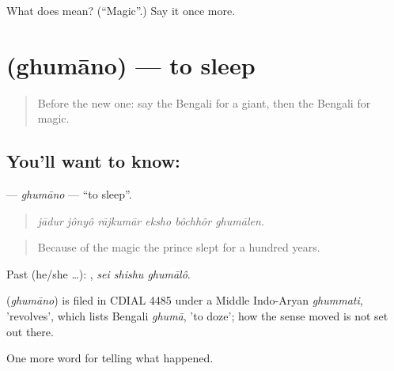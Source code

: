 \begin{tcolorbox}[breakable,colback=teal!4,colframe=teal!35!black,title={Before you move on}]
What does  mean? (\textquotedblleft{}Magic\textquotedblright{}.) Say it once more.
\end{tcolorbox}
\section[\texorpdfstring{\bn{ঘুমানো} (ghumāno)}{ঘুমানো (ghumāno)}]{ (ghumāno) — to sleep}

\label{lesson:BN-C321-ghumano}



\begin{quote}
Before the new one: say the Bengali for a giant, then the Bengali for magic.
\end{quote}

\subsection*{You'll want to know: }
\textbf{} — \emph{ghumāno} — \textquotedblleft{}to sleep\textquotedblright{}.

\begin{quote}
     
\end{quote}

\begin{quote}
\emph{jādur jônyô rājkumār eksho bôchhôr ghumālen.}
\end{quote}

\begin{quote}
Because of the magic the prince slept for a hundred years.
\end{quote}

Past (he/she …):   , \emph{sei shishu ghumālô}.

\begin{cousinweb}
\textbf{} (\emph{ghumāno}) is filed in CDIAL 4485 under a Middle Indo-Aryan \emph{ghummati}, 'revolves', which lists Bengali \emph{ghumā}, 'to doze'; how the sense moved is not set out there.
\end{cousinweb}

\begin{grammarlens}[title={What you've built}]
One more word for telling what happened.
\end{grammarlens}

